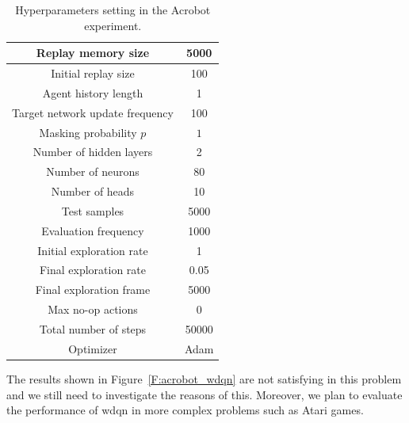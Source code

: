 \begin{table}[t]
 \centering
 \caption{Hyperparameters setting in the Acrobot experiment.}
 \label{T:acrobot_pars}
\begin{small}
\setlength{\tabcolsep}{4pt}
 \begin{tabular}{|c|c|}
\hline
Replay memory size & 5000\\
\hline
Initial replay size & 100\\
\hline
Agent history length & 1\\
\hline
Target network update frequency & 100\\
\hline
Masking probability $p$ & $1$\\
\hline
Number of hidden layers & 2\\
\hline
Number of neurons & 80\\
\hline
Number of heads & 10\\
\hline
Test samples & 5000\\
\hline
Evaluation frequency & 1000\\
\hline
Initial exploration rate & 1\\
\hline
Final exploration rate & 0.05\\
\hline
Final exploration frame & 5000\\
\hline
Max no-op actions & 0\\
\hline
Total number of steps & 50000\\
\hline
Optimizer & Adam\\
\hline
 \end{tabular}
 \end{small}
\end{table}

The results shown in Figure~\ref{F:acrobot_wdqn} are not satisfying in this problem and we still need to investigate the reasons of this. Moreover, we plan to evaluate the performance of \gls{wdqn} in more complex problems such as Atari games.
